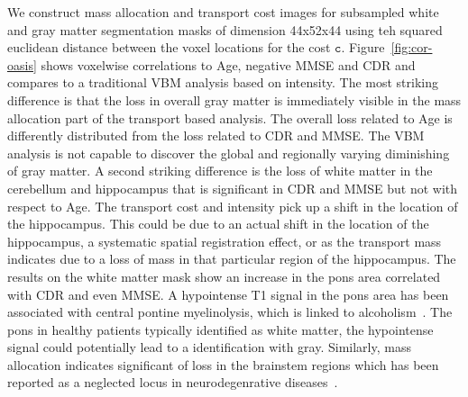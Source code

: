 \documentclass{llncs}
\newcommand{\cost}[0]{\mathtt{c}}
\begin{document}
We construct mass allocation and transport cost images for subsampled white and
gray matter segmentation masks of dimension 44x52x44 using teh squared
euclidean distance between the voxel locations for the cost $\cost$.
Figure~\ref{fig:cor-oasis} shows voxelwise correlations to Age, negative MMSE
and CDR and compares to a traditional VBM analysis based on intensity. The most
striking difference is that the loss in overall gray matter is immediately
visible in the mass allocation part of the transport based analysis. The
overall loss related to Age is differently distributed from the loss related to
CDR and MMSE. The VBM analysis is not capable to discover the global and
regionally varying diminishing of gray matter. A second striking difference is
the loss of white matter in the cerebellum and hippocampus that is significant
in CDR and MMSE but not with respect to Age.  The transport cost and intensity
pick up a shift in the location of the hippocampus. This could be due to an
actual shift in the location of the hippocampus, a systematic spatial
registration effect, or as the transport mass indicates due to a loss of mass
in that particular region of the hippocampus.
The results on the white matter mask show an increase in the pons area
correlated with CDR and even MMSE.  A hypointense  T1 signal in the pons area
has been associated with central pontine myelinolysis, which is linked to
alcoholism~\cite{quach2014early}. The pons in healthy patients typically
identified as white matter, the hypointense signal could potentially lead to a
identification with gray. Similarly, mass allocation indicates significant of
loss in the brainstem regions which has been reported as a neglected locus in
neurodegenrative diseases~\cite{grinberg2011brainstem}.  
\end{document}
